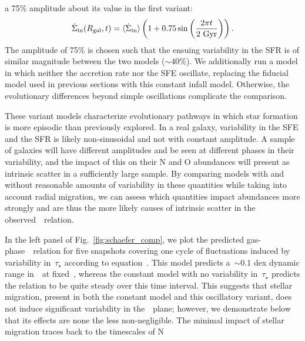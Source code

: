 \documentclass[ms.tex]{subfiles}
\begin{document}
a 75\% amplitude about its value in the first variant:
\begin{equation}
\dot{\Sigma}_\text{in}(R_\text{gal}, t) = \langle\dot{\Sigma}_\text{in}\rangle
\left(1 + 0.75\sin\left(\frac{2\pi t}{2~\text{Gyr}}\right)\right).
\label{eq:ifr_var}
\end{equation}
The amplitude of 75\% is chosen such that the ensuing variability in the SFR is
of similar magnitude between the two models ($\sim$40\%).
We additionally run a model in which neither the accretion rate nor the SFE
oscillate, replacing the fiducial model used in previous sections with this
constant infall model.
Otherwise, the evolutionary differences beyond simple oscillations complicate
the comparison.
\par
These variant models characterize evolutionary pathways in which star formation
is more episodic than previously explored.
In a real galaxy, variability in the SFE and the SFR is likely non-sinusoidal
and not with constant amplitude.
A sample of galaxies will have different amplitudes and be seen at different
phases in their variability, and the impact of this on their N and O abundances
will present as intrinsic scatter in a sufficiently large sample.
By comparing models with and without reasonable amounts of variability in these
quantities while taking into account radial migration, we can assess which
quantities impact abundances more strongly and are thus the more likely causes
of intrinsic scatter in the observed~\ohno~relation.
\par
In the left panel of Fig.~\ref{fig:schaefer_comp}, we plot the predicted
gas-phase~\ohno~relation for five snapshots covering one cycle of fluctuations
induced by variability in~$\tau_\star$ according to equation~.
This model predicts a~$\sim$0.1 dex dynamic range in~\no~at fixed~\oh, whereas
the constant model with no variability in~$\tau_\star$ predicts the relation
to be quite steady over this time interval.
This suggests that stellar migration, present in both the constant model and
this oscillatory variant, does not induce significant variability in
the~\ohno~plane; however, we demonstrate below that its effects are none the
less non-negligible.
The minimal impact of stellar migration traces back to the timescales of N
\end{document}

